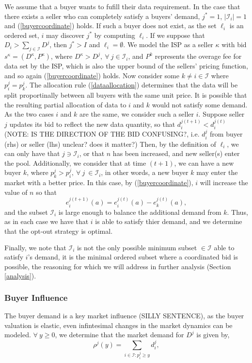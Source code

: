 \documentclass[12pt]{article}
\theoremstyle{definition}
\newcommand{\mcI}{\mathcal{I}}
\begin{document}
\begin{multicols}{2}
We assume that a buyer wants to fufill their data requirement.
In the case that there exists a seller who can completely satisfy a buyers'
demand, $j^*=1$, $\vert \mcI_i\vert =1$ and (\ref{buyercoordinate}) holds. If such a buyer does not exist,
as the set $\ell_i$ is an ordered set, $i$ may discover 
$j^*$ by computing $\ell_i$. If we suppose that $D_i >
\sum_{j\in\mcI}D^j$, then $j^* > I$ and $\ell_i = \emptyset$. 
We model the ISP as a seller $\kappa$ with bid $s^\kappa =(D^\kappa, P^\kappa)$,
where $D^\kappa > D^j, \
\forall \ j\in\mcI_i$, and
$P^k$ represents the overage fee for data set by the ISP, which is also the upper bound of the sellers'
pricing function, and so again (\ref{buyercoordinate}) holds.
Now consider some $k \ne i \in \mcI$ where $p_i^j = p_k^j$. 
The allocation rule (\ref{dataallocation}) determines that the data will be split proportinally
between all buyers with the same unit price. 
It is possible that the resulting partial allocation of data to $i$ and $k$
would not satisfy some demand. As the two cases $i$ and $k$ are the same, we consider such
a seller $i$. Suppose seller $j$ updates its
bid to reflect the new data quantity, so that $d_i^{j(t+1)} < d_i^{j(t)}$ (NOTE:
IS THE DIRECTION OF THE BID CONFUSING?, i.e. $d_i^j$ from buyer (rhs) or seller
(lhs) unclear? does it matter?) Then, by the definition of $\ell_i$, we can
only have that $j \ni \mcI_i$, or that $n$ has been increased, and new seller(s)
enter the pool. 
Additionally, we consider that at time $(t+1)$, we can have a 
new buyer $k$, where $p_k^j > p_i^j, \ \forall \ j \ \in \mcI_i$, in other
words, a new buyer $k$ may enter the market with a better price. In this case, by (\ref{buyercoordinate}), $i$ will increase the value of
$n$ so that
$$
    e_i^{j(t+1)}(a) = e_i^{j(t)}(a) - e_k^{j(t)}(a),
$$
and the subset $\mcI_i$ is large enough to balance the additional demand from
$k$. Thus, as in each case we have that $i$ is able to satisfy thier demand,
and we determine that the opt-out strategy is optimal.

Finally, we note that $\mcI_i$ is not the only
possible minimum subset $\in\mcI$ able to satisfy $i$'s demand, it is the
minimal ordered subset where a
coordinated bid is possible, the reasoning for which we will address in further analysis (Section
\ref{analysis}). 

\subsubsection{Buyer Influence}
The buyer demand is a key market influence (SILLY SENTENCE), as the buyer
valuation is elastic, even infintesimal changes in the market dynamics can be
modeled. $\forall \ y\ge 0$, we determine that the market demand for $D^j$ is given by,
\begin{equation}\label{datademand}
    \rho^j(y) = \sum_{i\in\mcI : p_i^j\ge y} d_i^j, 
\end{equation}


\end{multicols}
\end{document}
